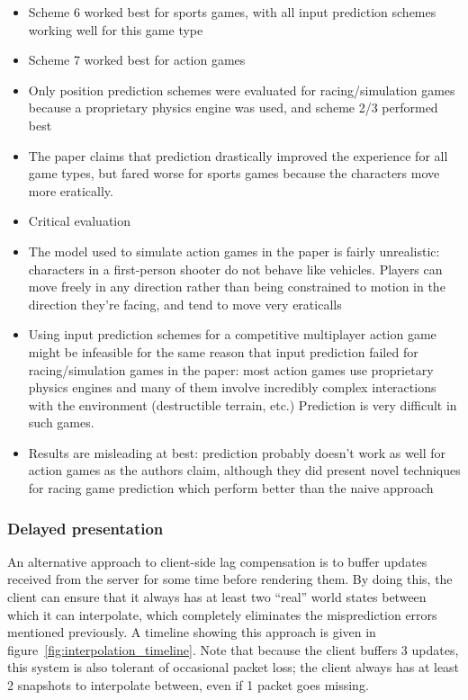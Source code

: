 \documentclass[conference]{IEEEtran}
\begin{document}
\begin{itemize}
		\item Scheme 6 worked best for sports games, with all input prediction schemes working well for this game type
		\item Scheme 7 worked best for action games
		\item Only position prediction schemes were evaluated for racing/simulation games because a proprietary physics engine was used, and scheme 2/3 performed best
		\item The paper claims that prediction drastically improved the experience for all game types, but fared worse for sports games because the characters move more eratically.
		\item Critical evaluation
		\item The model used to simulate action games in the paper is fairly unrealistic: characters in a first-person shooter do not behave like vehicles. Players can move freely in any direction rather than being constrained to motion in the direction they're facing, and tend to move very eraticalls
		\item Using input prediction schemes for a competitive multiplayer action game might be infeasible for the same reason that input prediction failed for racing/simulation games in the paper: most action games use proprietary physics engines and many of them involve incredibly complex interactions with the environment (destructible terrain, etc.) Prediction is very difficult in such games.
		\item Results are misleading at best: prediction probably doesn't work as well for action games as the authors claim, although they did present novel techniques for racing game prediction which perform better than the naive approach
	\end{itemize}
	\subsubsection{Delayed presentation}

	An alternative approach to client-side lag compensation is to buffer updates received from the server for some time before rendering them. By doing this, the client can ensure that it always has at least two ``real'' world states between which it can interpolate, which completely eliminates the misprediction errors mentioned previously. A timeline showing this approach is given in figure~\ref{fig:interpolation_timeline}. Note that because the client buffers 3 updates, this system is also tolerant of occasional packet loss; the client always has at least 2 snapshots to interpolate between, even if 1 packet goes missing.
\end{document}
